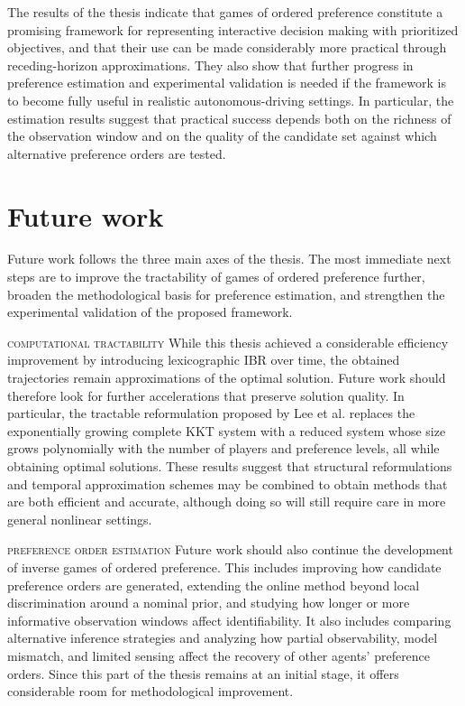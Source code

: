 The results of the thesis indicate that games of ordered
preference constitute a promising framework for representing interactive
decision making with prioritized objectives, and that their use can be
made considerably more practical through receding-horizon approximations.
They also show that further progress in
preference estimation and experimental validation is needed if the
framework is to become fully useful in realistic autonomous-driving
settings. In particular, the estimation results suggest that practical
success depends both on the richness of the observation window and on the
quality of the candidate set against which alternative preference orders
are tested.

\section{Future work}

Future work follows the three main axes of the thesis. The most immediate
next steps are to improve the tractability of games of ordered
preference further, broaden the methodological basis for preference
estimation, and strengthen the experimental validation of the proposed
framework.

\smallskip \noindent
\textsc{computational tractability} \quad
While this thesis achieved a considerable efficiency improvement by
introducing lexicographic IBR over time, the obtained trajectories
remain approximations of the optimal solution. Future work should
therefore look for further accelerations that preserve solution
quality.
In particular, the tractable
reformulation proposed by Lee et al. \cite{lee:2026} replaces the
exponentially growing complete KKT system with a reduced system whose
size grows polynomially with the number of players and preference levels, all
while obtaining optimal solutions.
These results suggest that structural reformulations and temporal
approximation schemes may be combined to obtain methods that are both
efficient and accurate, although doing so will still require care in
more general nonlinear settings.

\smallskip \noindent
\textsc{preference order estimation} \quad
Future work should also continue the development of inverse games of
ordered preference. This includes improving how candidate preference
orders are generated, extending the online method beyond local
discrimination around a nominal prior, and studying how longer or more
informative observation windows affect identifiability. It also includes
comparing alternative inference strategies and analyzing how partial
observability, model mismatch, and limited sensing affect the recovery of
other agents' preference orders. Since this part of the thesis remains at
an initial stage, it offers considerable room for methodological
improvement.

